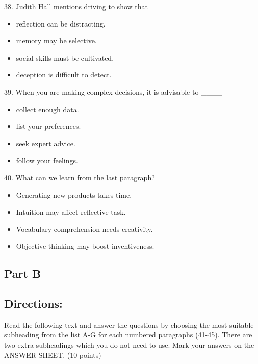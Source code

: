 \documentclass[UTF8,11pt]{ctexart}
\begin{document}
38. Judith Hall mentions driving to show that \_\_\_\_


\begin{itemize}[leftmargin=2em,itemsep=.2em,topsep=.4em]\item[A.] reflection can be distracting.
\item[B.] memory may be selective.
\item[C.] social skills must be cultivated.
\item[D.] deception is difficult to detect.
\end{itemize}

39. When you are making complex decisions, it is advisable to \_\_\_\_


\begin{itemize}[leftmargin=2em,itemsep=.2em,topsep=.4em]\item[A.] collect enough data.
\item[B.] list your preferences.
\item[C.] seek expert advice.
\item[D.] follow your feelings.
\end{itemize}

40. What can we learn from the last paragraph?


\begin{itemize}[leftmargin=2em,itemsep=.2em,topsep=.4em]\item[A.] Generating new products takes time.
\item[B.] Intuition may affect reflective task.
\item[C.] Vocabulary comprehension needs creativity.
\item[D.] Objective thinking may boost inventiveness.
\end{itemize}

\subsection*{\textbf{Part B}}


\subsection*{\textbf{Directions:}}


Read the following text and answer the questions by choosing the most suitable subheading from the list A-G for each numbered paragraphs (41-45). There are two extra subheadings which you do not need to use. Mark your answers on the ANSWER SHEET. (10 points)
\end{document}
